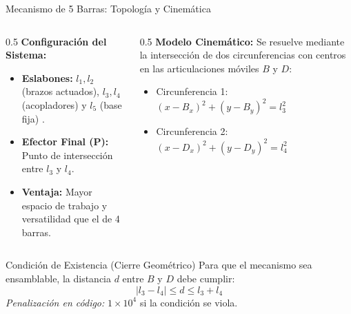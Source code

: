 \documentclass[xcolor={table,dvipsnames}]{beamer}
\begin{document}
\begin{frame}{Mecanismo de 5 Barras: Topolog\'ia y Cinem\'atica}
    \begin{columns}[T]
        \begin{column}{0.5\textwidth}
            \textbf{Configuraci\'on del Sistema:}
            \begin{itemize}
                \item \textbf{Eslabones:} $l_1, l_2$ (brazos actuados), $l_3, l_4$ (acopladores) y $l_5$ (base fija) \cite{Liu2006}.
                \item \textbf{Efector Final (P):} Punto de intersecci\'on entre $l_3$ y $l_4$.
                \item \textbf{Ventaja:} Mayor espacio de trabajo y versatilidad que el de 4 barras.
            \end{itemize}
        \end{column}

        \begin{column}{0.5\textwidth}
            \textbf{Modelo Cinem\'atico:}
            Se resuelve mediante la intersecci\'on de dos circunferencias con centros en las articulaciones m\'oviles $B$ y $D$:
            \begin{itemize}
                \item Circunferencia 1: $(x-B_x)^2 + (y-B_y)^2 = l_3^2$
                \item Circunferencia 2: $(x-D_x)^2 + (y-D_y)^2 = l_4^2$
            \end{itemize}
        \end{column}
    \end{columns}

    \scriptsize
    \begin{block}{Condici\'on de Existencia (Cierre Geom\'etrico)}
        Para que el mecanismo sea ensamblable, la distancia $d$ entre $B$ y $D$ debe cumplir:
        \[ |l_3 - l_4| \leq d \leq l_3 + l_4 \]
        \textit{Penalizaci\'on en c\'odigo:} $1 \times 10^4$ si la condici\'on se viola.
    \end{block}
\end{frame}
\end{document}

